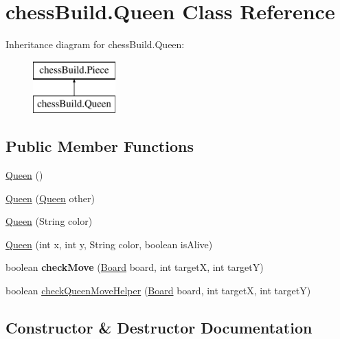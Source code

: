 \hypertarget{classchess_build_1_1_queen}{}\section{chess\+Build.\+Queen Class Reference}
\label{classchess_build_1_1_queen}
Inheritance diagram for chess\+Build.\+Queen\+:\begin{figure}[H]
\begin{center}
\leavevmode
\includegraphics[height=2.000000cm]{classchess_build_1_1_queen}
\end{center}
\end{figure}
\subsection*{Public Member Functions}
\begin{DoxyCompactItemize}
\item 
\hyperlink{classchess_build_1_1_queen_a658925f2dd8632546a22d67ff1a8c4bf}{Queen} ()
\item 
\hyperlink{classchess_build_1_1_queen_a6569f23986b77bf85faeac5f15661a6c}{Queen} (\hyperlink{classchess_build_1_1_queen}{Queen} other)
\item 
\hyperlink{classchess_build_1_1_queen_a142d6ff4a3adb06f4594d0e91549ad92}{Queen} (String color)
\item 
\hyperlink{classchess_build_1_1_queen_a205a888b7cd5393711634e4e6f39fe5e}{Queen} (int x, int y, String color, boolean is\+Alive)
\item 
\mbox{\label{classchess_build_1_1_queen_aba9cbeff1f0aed91f0dcf1373d13efca}} 
boolean {\bfseries check\+Move} (\hyperlink{classchess_build_1_1_board}{Board} board, int targetX, int targetY)
\item 
boolean \hyperlink{classchess_build_1_1_queen_ab08d98e2b32cfcc4095b468aa9d7248e}{check\+Queen\+Move\+Helper} (\hyperlink{classchess_build_1_1_board}{Board} board, int targetX, int targetY)
\end{DoxyCompactItemize}


\subsection{Constructor \& Destructor Documentation}
\mbox{\label{classchess_build_1_1_queen_a658925f2dd8632546a22d67ff1a8c4bf}} 
